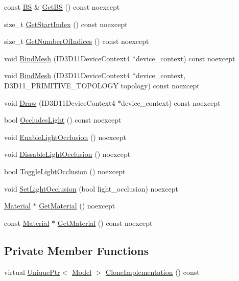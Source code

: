 \begin{DoxyCompactItemize}
\item 
const \hyperlink{structmage_1_1_b_s}{BS} \& \hyperlink{classmage_1_1_model_a7d99f18fd9cd6902795f77995b87bea2}{Get\+BS} () const noexcept
\item 
size\+\_\+t \hyperlink{classmage_1_1_model_a876fcfe369f12e2d7edb6b533dd06252}{Get\+Start\+Index} () const noexcept
\item 
size\+\_\+t \hyperlink{classmage_1_1_model_a37c9814a445159fd742bcc1b9a5a7b94}{Get\+Number\+Of\+Indices} () const noexcept
\item 
void \hyperlink{classmage_1_1_model_a0ee2a2b1bed4600f052af46ffcf12884}{Bind\+Mesh} (I\+D3\+D11\+Device\+Context4 $\ast$device\+\_\+context) const noexcept
\item 
void \hyperlink{classmage_1_1_model_a3eb8cec219dd224e302f832690324e14}{Bind\+Mesh} (I\+D3\+D11\+Device\+Context4 $\ast$device\+\_\+context, D3\+D11\+\_\+\+P\+R\+I\+M\+I\+T\+I\+V\+E\+\_\+\+T\+O\+P\+O\+L\+O\+GY topology) const noexcept
\item 
void \hyperlink{classmage_1_1_model_aa0358375a2906b24ce4f3e0ddc4cdd01}{Draw} (I\+D3\+D11\+Device\+Context4 $\ast$device\+\_\+context) const noexcept
\item 
bool \hyperlink{classmage_1_1_model_a2ab5542819b80d58f349128a6c0194b5}{Occludes\+Light} () const noexcept
\item 
void \hyperlink{classmage_1_1_model_a5fd5e62a3365810d84af4cf9c202a9fa}{Enable\+Light\+Occlusion} () noexcept
\item 
void \hyperlink{classmage_1_1_model_a7e21b77f1f0afa83fef7a0398d6a9411}{Dissable\+Light\+Occlusion} () noexcept
\item 
bool \hyperlink{classmage_1_1_model_a68168e66cb04c08f27616e9d7768a99e}{Toggle\+Light\+Occlusion} () noexcept
\item 
void \hyperlink{classmage_1_1_model_aabcd12eeab9d6b81e27c727cb94cf57a}{Set\+Light\+Occlusion} (bool light\+\_\+occlusion) noexcept
\item 
\hyperlink{classmage_1_1_material}{Material} $\ast$ \hyperlink{classmage_1_1_model_a46728db5ca9052c62e9403ec7d6a6c21}{Get\+Material} () noexcept
\item 
const \hyperlink{classmage_1_1_material}{Material} $\ast$ \hyperlink{classmage_1_1_model_a10a9de6608365356b5b6ad2669ab39f8}{Get\+Material} () const noexcept
\end{DoxyCompactItemize}
\subsection*{Private Member Functions}
\begin{DoxyCompactItemize}
\item 
virtual \hyperlink{namespacemage_a3316d7143a973e37adf1110f2e80ca31}{Unique\+Ptr}$<$ \hyperlink{classmage_1_1_model}{Model} $>$ \hyperlink{classmage_1_1_model_a4e32ba81c5305dd23dfe760765a5b7d2}{Clone\+Implementation} () const
\end{DoxyCompactItemize}
